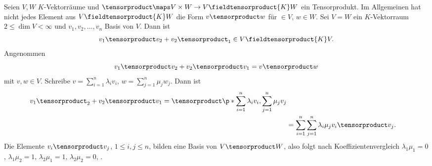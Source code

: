 \begin{bemerkung*}
  Seien \( V,W \) \( K \)-Vektorräume und \( \tensorproduct \maps V\times W\to V\fieldtensorproduct{K} W \) ein Tensorprodukt. Im Allgemeinen hat nicht jedes Element aus \( V\fieldtensorproduct{K}W \) die Form \( v\tensorproduct w \) für \( \in V \), \( w\in W \). Sei \zb \( V=W \) ein \( K \)-Vektorraum \( 2\leq \dim{V}<\infty \) und \( v_1,v_2,\dotsc,v_n \) Basis von \( V \). Dann ist
  \begin{equation*}
    v_1\tensorproduct v_2+v_2\tensorproduct _1\in V\fieldtensorproduct{K}V.
  \end{equation*}
  Angenommen
  \begin{equation*}
    v_1\tensorproduct v_2+v_2\tensorproduct v_1=v\tensorproduct w
  \end{equation*}
  mit \( v,w\in V \). Schreibe \( v=\sum_{i=1}^{n}\lambda_i v_i \), \( w=\sum_{j=1}^{n}\mu_j w_j \). Dann ist
  \begin{align*}
    v_1\tensorproduct _2+v_2\tensorproduct v_1=\tensorproduct \p*{\sum_{i=1}^{n}\lambda_i v_i, \sum_{j=1}^{n}\mu_j v_j}\\
    &=\sum_{i=1}^{n}\sum_{j=1}^{n}\lambda_i \mu_j v_i\tensorproduct v_j.
  \end{align*}
Die Elemente \( v_i\tensorproduct v_j \), \( 1\leq i,j\leq n \), bilden eine Basis von \( V\tensorproduct W \), also folgt nach Koeffizientenvergleich \( \lambda_1 \mu_1=0 \), \( \lambda_1\mu_2=1 \), \( \lambda_2\mu_1=1 \), \( \lambda_2 \mu_2=0 \), \contra.
\end{bemerkung*}
